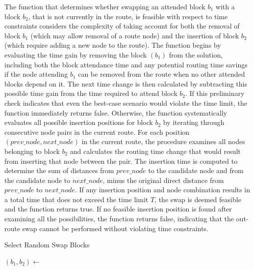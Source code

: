 The function that determines whether swapping an attended block $b_1$ with a block $b_2$, that is not currently in the route, is feasible with respect to time constraints considers the complexity of taking account for both the removal of block $b_1$ (which may allow removal of a route node) and the insertion of block $b_2$ (which require adding a new node to the route).
The function begins by evaluating the time gain by removing the block $(b_1)$ from the solution, including both the block attendance time and any potential routing time savings if the node attending $b_1$ can be removed from the route when no other attended blocks depend on it.
The next time change is then calculated by subtracting this possible time gain from the time required to attend block $b_2$.
If this preliminary check indicates that even the best-case scenario would violate the time limit, the function immediately returns false.
Otherwise, the function systematically evaluates all possible insertion positions for block $b_2$ by iterating through consecutive node pairs in the current route.
For each position $(prev\_node, next\_node)$ in the current route, the procedure examines all nodes belonging to block $b_2$ and calculates the routing time change that would result from inserting that node between the pair. The insertion time is computed to determine the sum of distances from $prev\_node$ to the candidate node and from the candidate node to $next\_node$, minus the original direct distance from $prev\_node$ to $next\_node$.
If any insertion position and node combination results in a total time that does not exceed the time limit $T$, the swap is deemed feasible and the function returns true. If no feasible insertion position is found after examining all the possibilities, the function returns false, indicating that the out-route swap cannot be performed without violating time constraints.

\begin{algorithm}[h!]
	\caption{Select Random Swap Blocks} \label{alg:select-random-swap-blocks}
	\SetAlgoLined

	$(b_1, b_2) \leftarrow$ \;
	\;
\end{algorithm}

